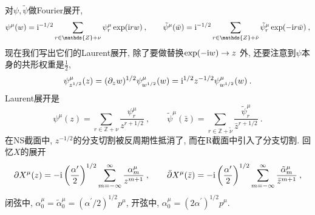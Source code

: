 对$ \psi,\tilde{\psi} $做Fourier展开,
\begin{equation}
    \psi^{\mu}(w) =\mi^{-1/2} \sum_{r\in\mathds{Z}+\nu}\psi^{\mu}_{r}\exp(\mi r w)\:, \qquad
    \tilde{\psi}^{\mu}(\bar{w})=\mi^{-1/2} \sum_{r\in\mathds{Z}+\tilde{\nu}}\tilde{\psi}^{\mu}_{r}\exp(-\mi r\bar{w})\:,
    \label{10.2.5}
\end{equation}
现在我们写出它们的Laurent展开, 除了要做替换$ \exp(-\mathrm{i} w)\to z$ 外, 还要注意到$ \psi $本身的共形权重是$\frac{1}{2}$,
\begin{equation}
    \psi^{\mu}_{z^{1/2}}(z)=(\partial_{z}w)^{1/2}\psi_{w^{1/2}}^{\mu}(w)
    =\mathrm{i}^{1/2}z^{-1/2}\psi^{\mu}_{w^{1/2}}(w) \:. \label{10.2.6}
\end{equation}
Laurent展开是
\begin{equation}
    \psi^{\mu}(z) = \sum_{r\in\mathds{Z}+\nu}\frac{\psi^{\mu}_{r}}{z^{r+1/2}}\:, \qquad
    \tilde{\psi}^{\mu}(\bar{z})=\sum_{r\in\mathds{Z}+\tilde{\nu}}\frac{\tilde{\psi}^{\mu}_{r}}{\bar{z}^{r+1/2}}\:.
    \label{10.2.7}
\end{equation}
在NS截面中, $z^{-1/2}$的分支切割被反周期性抵消了, 而在R截面中引入了分支切割. 回忆$X$的展开
\begin{equation}
    \partial X^{\mu}(z)=-\mathrm{i}\left(\frac{\alpha^{\prime}}{2}\right)^{1/2} \sum_{m=-\infty}^{\infty}\frac{\alpha_{m}^{\mu}}{z^{m+1}} \:, \qquad
    \bar{\partial} X^{\mu}(\bar{z}) =-\mathrm{i}\left(\frac{\alpha^{\prime}}{2}\right)^{1/2} \sum_{m=-\infty}^{\infty}
    \frac{\tilde{\alpha}_{m}^{\mu}}{\bar{z}^{m+1}} \:, \label{10.2.8}
\end{equation}
闭弦中, $\alpha^{\mu}_{0}=\tilde{\alpha}_{0}^{\mu}=(\alpha^{\prime}/2)^{1/2}p^{\mu}$, 开弦中, $\alpha^{\mu}_{0}=(2\alpha^{\prime})^{1/2}p^{\mu}$.

